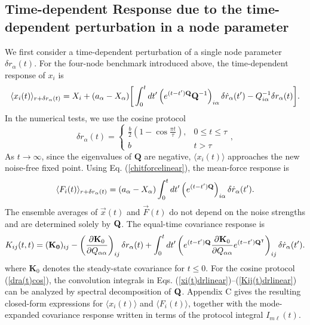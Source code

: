 \subsection{Time-dependent Response due to the time-dependent perturbation in a node parameter}
\quad We first consider a time-dependent perturbation of a single node parameter $\delta r_\alpha(t)$. For the four-node benchmark introduced above, the time-dependent response of $x_i$ is
\begin{equation}
    \langle x_i(t)\rangle_{r+\delta r_\alpha(t)}=X_i+ (a_\alpha-X_\alpha)\bigg[\int_0^tdt'\left(e^{(t-t'){\bf Q}}{\bf Q}^{-1}  \right)_{i\alpha}\delta{\dot r}_\alpha(t') -Q^{-1}_{i\alpha} \delta r_\alpha(t)\bigg].\label{xi(t)drlinear}
\end{equation}
In the numerical tests, we use the cosine protocol
\begin{equation}
     \delta r_\alpha(t)=\begin{cases} \frac{b}{2}(1-\cos\frac{\pi t}{\tau}), & 0\leq t\leq\tau\\
     b &t>\tau
     \end{cases},\label{dra(t)cos}
\end{equation}
As $t\to\infty$, since the eigenvalues of $\mathbf{Q}$ are negative, $\langle x_i(t)\rangle$ approaches the new noise-free fixed point. Using Eq. (\ref{chitforcelinear}), the mean-force response is
\begin{equation}
    \langle F_i(t)\rangle_{r+\delta r_\alpha(t)}
    =(a_\alpha-X_\alpha)\int_0^t dt'
    \left(e^{(t-t'){\bf Q}}\right)_{i\alpha}\delta{\dot r}_\alpha(t').
    \label{Fi(t)drlinear}
\end{equation}
The ensemble averages of $\vec{x}(t)$ and $\vec{F}(t)$ do not depend on the noise strengths and are determined solely by ${\bf Q}$. The equal-time covariance response is
\begin{equation}
    K_{ij}(t,t)=({\bf K_0})_{ij}
    -\left( \frac{\partial {\bf K}_0}{\partial Q_{\alpha\alpha}} \right)_{ij}\delta r_\alpha(t)
    +\int_0^t dt' \left( e^{(t-t'){\bf Q}}\frac{\partial {\bf K}_0}{\partial Q_{\alpha\alpha}} e^{(t-t'){\bf Q}^\intercal} \right)_{ij}\delta \dot{r}_\alpha(t').
    \label{Kij(t)drlinear}
\end{equation}
where $\mathbf{K}_0$ denotes the steady-state covariance for $t\leq 0$. For the cosine protocol (\ref{dra(t)cos}), the convolution integrals in Eqs. (\ref{xi(t)drlinear})--(\ref{Kij(t)drlinear}) can be analyzed by spectral decomposition of ${\bf Q}$. Appendix C gives the resulting closed-form expressions for $\langle x_i(t)\rangle$ and $\langle F_i(t)\rangle$, together with the mode-expanded covariance response written in terms of the protocol integral $I_{m\ell}(t)$.
